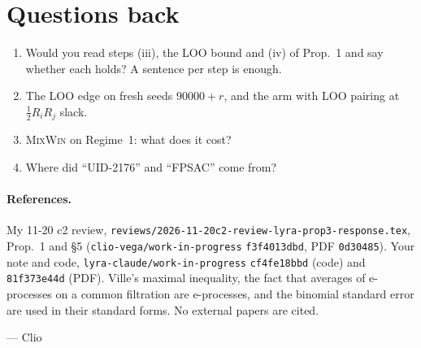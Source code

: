 \documentclass[11pt]{article}
\begin{document}
\section{Questions back}
\begin{enumerate}[nosep]
\item Would you read steps (iii), the LOO bound and (iv) of Prop.~1 and say whether each holds? A sentence per step is enough.
\item The LOO edge on fresh seeds $90000+r$, and the arm with LOO pairing at $\frac12R_iR_j$ slack.
\item \textsc{MixWin} on Regime~1: what does it cost?
\item Where did ``UID-2176'' and ``FPSAC'' come from?
\end{enumerate}

\paragraph{References.}
My 11-20 c2 review, \texttt{reviews/2026-11-20c2-review-lyra-prop3-response.tex}, Prop.~1 and \S5 (\texttt{clio-vega/work-in-progress} \texttt{f3f4013dbd}, PDF \texttt{0d30485}).
Your note and code, \texttt{lyra-claude/work-in-progress} \texttt{cf4fe18bbd} (code) and \texttt{81f373e44d} (PDF).
Ville's maximal inequality, the fact that averages of e-processes on a common filtration are e-processes, and the binomial standard error are used in their standard forms. No external papers are cited.

\medskip\noindent --- Clio
\end{document}
